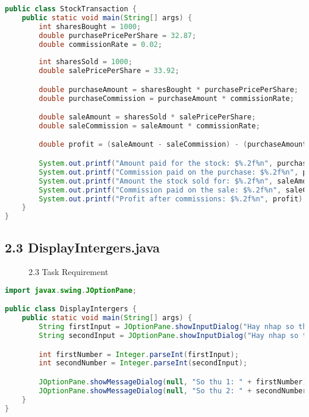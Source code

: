 \documentclass{article}
\begin{document}
\begin{lstlisting}[language=Java, caption=StockTransaction.java]
public class StockTransaction {
    public static void main(String[] args) {
        int sharesBought = 1000;
        double purchasePricePerShare = 32.87;
        double commissionRate = 0.02;
        
        int sharesSold = 1000;
        double salePricePerShare = 33.92;

        double purchaseAmount = sharesBought * purchasePricePerShare;
        double purchaseCommission = purchaseAmount * commissionRate;

        double saleAmount = sharesSold * salePricePerShare;
        double saleCommission = saleAmount * commissionRate;

        double profit = (saleAmount - saleCommission) - (purchaseAmount + purchaseCommission);

        System.out.printf("Amount paid for the stock: $%.2f%n", purchaseAmount);
        System.out.printf("Commission paid on the purchase: $%.2f%n", purchaseCommission);
        System.out.printf("Amount the stock sold for: $%.2f%n", saleAmount);
        System.out.printf("Commission paid on the sale: $%.2f%n", saleCommission);
        System.out.printf("Profit after commissions: $%.2f%n", profit);
    }
}
\end{lstlisting}

\subsection*{2.3 DisplayIntergers.java}

\begin{figure}[H]
    \centering
    \caption{2.3 Task Requirement}
\end{figure}

\begin{lstlisting}[language=Java, caption=DisplayIntergers.java]
import javax.swing.JOptionPane;

public class DisplayIntergers {
    public static void main(String[] args) {
        String firstInput = JOptionPane.showInputDialog("Hay nhap so thu 1:");
        String secondInput = JOptionPane.showInputDialog("Hay nhap so thu 2:");

        int firstNumber = Integer.parseInt(firstInput);
        int secondNumber = Integer.parseInt(secondInput);

        JOptionPane.showMessageDialog(null, "So thu 1: " + firstNumber);
        JOptionPane.showMessageDialog(null, "So thu 2: " + secondNumber);
    }
}
\end{lstlisting}
\end{document}
